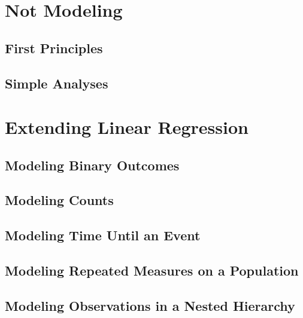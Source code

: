\documentclass[
]{krantz}
\begin{document}
\hypertarget{not-modeling}{%
\section{Not Modeling}\label{not-modeling}}

\hypertarget{first-principles}{%
\subsection{First Principles}\label{first-principles}}

\hypertarget{simple-analyses}{%
\subsection{Simple Analyses}\label{simple-analyses}}

\hypertarget{extending-linear-regression}{%
\section{Extending Linear Regression}\label{extending-linear-regression}}

\hypertarget{modeling-binary-outcomes}{%
\subsection{Modeling Binary Outcomes}\label{modeling-binary-outcomes}}

\hypertarget{modeling-counts}{%
\subsection{Modeling Counts}\label{modeling-counts}}

\hypertarget{modeling-time-until-an-event}{%
\subsection{Modeling Time Until an Event}\label{modeling-time-until-an-event}}

\hypertarget{modeling-repeated-measures-on-a-population}{%
\subsection{Modeling Repeated Measures on a Population}\label{modeling-repeated-measures-on-a-population}}

\hypertarget{modeling-observations-in-a-nested-hierarchy}{%
\subsection{Modeling Observations in a Nested Hierarchy}\label{modeling-observations-in-a-nested-hierarchy}}
\end{document}

